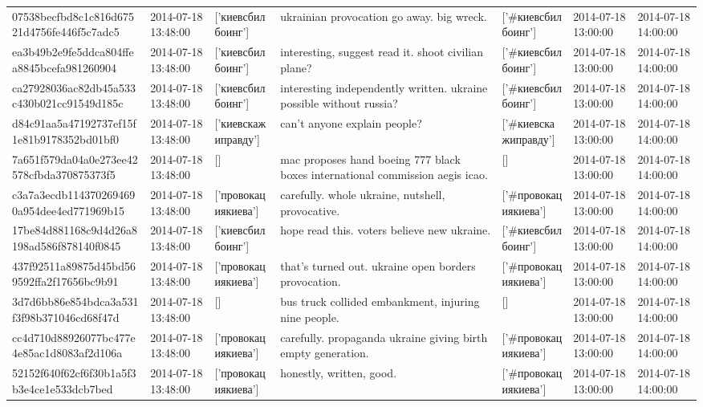 \begin{tabular}{lllllll}
07538becfbd8c1c816d67521d4756fe446f5c7adc5 & 2014-07-18 13:48:00 & ['киевсбилбоинг'] & ukrainian provocation go away. big wreck. & ['#киевсбилбоинг'] & 2014-07-18 13:00:00 & 2014-07-18 14:00:00 \\
ea3b49b2e9fe5ddca804ffea8845bcefa981260904 & 2014-07-18 13:48:00 & ['киевсбилбоинг'] & interesting, suggest read it. shoot civilian plane? & ['#киевсбилбоинг'] & 2014-07-18 13:00:00 & 2014-07-18 14:00:00 \\
ca27928036ac82db45a533c430b021cc91549d185c & 2014-07-18 13:48:00 & ['киевсбилбоинг'] & interesting independently written. ukraine possible without russia? & ['#киевсбилбоинг'] & 2014-07-18 13:00:00 & 2014-07-18 14:00:00 \\
d84c91aa5a47192737ef15f1e81b9178352bd01bf0 & 2014-07-18 13:48:00 & ['киевскажиправду'] & can't anyone explain people? & ['#киевскажиправду'] & 2014-07-18 13:00:00 & 2014-07-18 14:00:00 \\
7a651f579da04a0e273ee42578cfbda370875373f5 & 2014-07-18 13:48:00 & [] & mac proposes hand boeing 777 black boxes international commission aegis icao. & [] & 2014-07-18 13:00:00 & 2014-07-18 14:00:00 \\
c3a7a3ecdb1143702694690a954dee4ed771969b15 & 2014-07-18 13:48:00 & ['провокациякиева'] & carefully. whole ukraine, nutshell, provocative. & ['#провокациякиева'] & 2014-07-18 13:00:00 & 2014-07-18 14:00:00 \\
17be84d881168c9d4d26a8198ad586f878140f0845 & 2014-07-18 13:48:00 & ['киевсбилбоинг'] & hope read this. voters believe new ukraine. & ['#киевсбилбоинг'] & 2014-07-18 13:00:00 & 2014-07-18 14:00:00 \\
437f92511a89875d45bd569592ffa2f17656bc9b91 & 2014-07-18 13:48:00 & ['провокациякиева'] & that's turned out. ukraine open borders provocation. & ['#провокациякиева'] & 2014-07-18 13:00:00 & 2014-07-18 14:00:00 \\
3d7d6bb86e854bdca3a531f3f98b371046cd68f47d & 2014-07-18 13:48:00 & [] & bus truck collided embankment, injuring nine people. & [] & 2014-07-18 13:00:00 & 2014-07-18 14:00:00 \\
cc4d710d88926077bc477e4e85ac1d8083af2d106a & 2014-07-18 13:48:00 & ['провокациякиева'] & carefully. propaganda ukraine giving birth empty generation. & ['#провокациякиева'] & 2014-07-18 13:00:00 & 2014-07-18 14:00:00 \\
52152f640f62cf6f30b1a5f3b3e4ce1e533dcb7bed & 2014-07-18 13:48:00 & ['провокациякиева'] & honestly, written, good. & ['#провокациякиева'] & 2014-07-18 13:00:00 & 2014-07-18 14:00:00 \\

\end{tabular}
